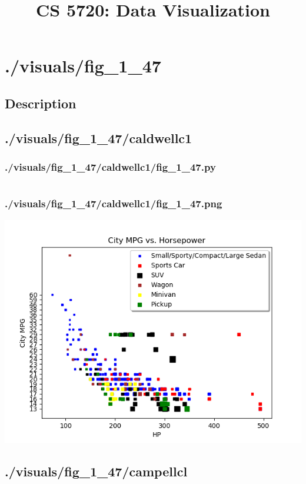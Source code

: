 \documentclass{report}
\begin{document}
    \title{CS 5720: Data Visualization}
    \maketitle
    \chapter{./visuals/fig\_1\_47}
    \section{Description}
    \small
    
    \pagebreak
    \section{./visuals/fig\_1\_47/caldwellc1}
    \subsection{./visuals/fig\_1\_47/caldwellc1/fig\_1\_47.py}
    \inputminted[breaklines=true]{python}{.././visuals/fig_1_47/caldwellc1/fig_1_47.py}
    \subsection{./visuals/fig\_1\_47/caldwellc1/fig\_1\_47.png}
    \includegraphics[width=\textwidth]{.././visuals/fig_1_47/caldwellc1/fig_1_47.png}
    \pagebreak
    \section{./visuals/fig\_1\_47/campellcl}
\end{document}
